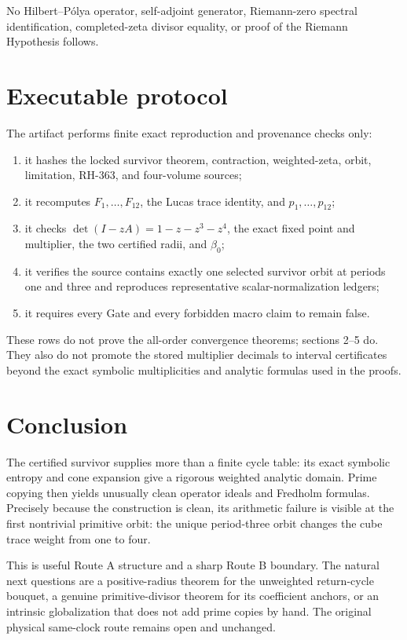 \documentclass[11pt]{article}
\numberwithin{equation}{section}
\theoremstyle{remark}
\begin{document}
No Hilbert--P\'olya operator, self-adjoint generator, Riemann-zero spectral
identification, completed-zeta divisor equality, or proof of the Riemann
Hypothesis follows.

\section{Executable protocol}

The artifact performs finite exact reproduction and provenance checks only:
\begin{enumerate}
\item it hashes the locked survivor theorem, contraction, weighted-zeta,
orbit, limitation, RH-363, and four-volume sources;
\item it recomputes \(F_1,\ldots,F_{12}\), the Lucas trace identity, and
\(p_1,\ldots,p_{12}\);
\item it checks
\(
\det(I-zA)=1-z-z^3-z^4
\), the exact fixed point and multiplier, the two certified radii, and
\(\beta_0\);
\item it verifies the source contains exactly one selected survivor orbit at
periods one and three and reproduces representative scalar-normalization
ledgers;
\item it requires every Gate and every forbidden macro claim to remain false.
\end{enumerate}

These rows do not prove the all-order convergence theorems; sections 2--5 do.
They also do not promote the stored multiplier decimals to interval
certificates beyond the exact symbolic multiplicities and analytic formulas
used in the proofs.

\section{Conclusion}

The certified survivor supplies more than a finite cycle table: its exact
symbolic entropy and cone expansion give a rigorous weighted analytic domain.
Prime copying then yields unusually clean operator ideals and Fredholm
formulas.  Precisely because the construction is clean, its arithmetic
failure is visible at the first nontrivial primitive orbit: the unique
period-three orbit changes the cube trace weight from one to four.

This is useful Route A structure and a sharp Route B boundary.  The natural
next questions are a positive-radius theorem for the unweighted return-cycle
bouquet, a genuine primitive-divisor theorem for its coefficient anchors, or
an intrinsic globalization that does not add prime copies by hand.  The
original physical same-clock route remains open and unchanged.



\end{document}
